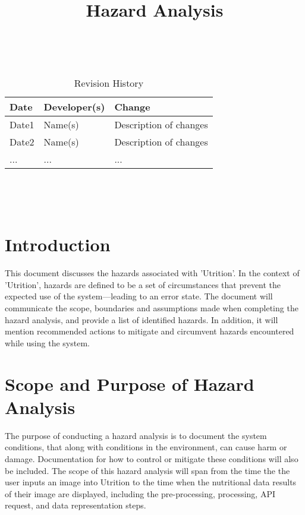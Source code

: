 \documentclass{article}
\title{Hazard Analysis\\\progname}
\author{\authname}
\date{}
\begin{document}
	
\maketitle
\thispagestyle{empty}

~\newpage


\begin{table}[hp]
	\caption{Revision History} \label{TblRevisionHistory}
	\begin{tabularx}{\textwidth}{llX}
		\toprule
		\textbf{Date} & \textbf{Developer(s)} & \textbf{Change}\\
		\midrule
		Date1 & Name(s) & Description of changes\\
		Date2 & Name(s) & Description of changes\\
		... & ... & ...\\
		\bottomrule
	\end{tabularx}
\end{table}

~\newpage

\tableofcontents

~\newpage



\section{Introduction}

This document discusses the hazards associated with 'Utrition'. In the context 
of 'Utrition', hazards are defined to be a set of circumstances that prevent 
the expected use of the system---leading to an error state. The document will 
communicate the scope, boundaries and assumptions made when completing the 
hazard analysis, and provide a list of identified hazards. In addition, it will 
mention recommended actions to mitigate and circumvent hazards encountered 
while using the system.

\section{Scope and Purpose of Hazard Analysis}
The purpose of conducting a hazard analysis is to document the system conditions, that along with conditions in the environment, can cause harm or damage. Documentation for how to control or mitigate these conditions will also be included. The scope of this hazard analysis will span from the time the the user inputs an image into Utrition to the time when the nutritional data results of their image are displayed, including the pre-processing, processing, API request, and data representation steps.
\end{document}
